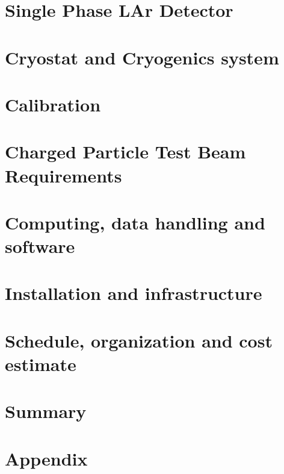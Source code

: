 \documentclass[12pt]{article}
\begin{document}
\section{Single Phase LAr Detector} 
	


\section{Cryostat and Cryogenics system} %
	
	
\section{Calibration}
	

\section{Charged Particle Test Beam Requirements} %
	


\section{Computing, data handling and software} %
	

\section{Installation and infrastructure}  %
	
	
	
\section{Schedule, organization and cost estimate} %
	

\newpage
\section{Summary}  %
	

\newpage
\section*{Appendix}  %
	



\end{document}
